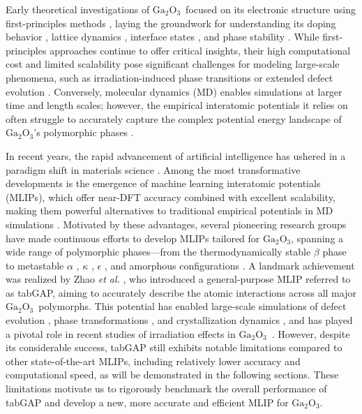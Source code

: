 \documentclass[%
reprint,
superscriptaddress,
 amsmath,amssymb,
 aps,
]{revtex4-2}
\newcommand{\ga}{$\text{Ga}_2\text{O}_3$}
\begin{document}
Early theoretical investigations of \ga\ focused on its electronic structure 
using first-principles methods \cite{he_first-principles_2006,xu_structure_2007,yoshioka_structures_2007}, 
laying the groundwork for understanding its doping behavior \cite{varley_oxygen_2010}, 
lattice dynamics \cite{yan_phonon_2018,yang_lattice_2024}, 
interface states \cite{bermudez_structure_2006}, and phase stability \cite{fan_low-energy_2022}. 
While first-principles approaches continue to offer critical insights, their high computational 
cost and limited scalability pose significant challenges for modeling large-scale phenomena, 
such as irradiation-induced phase transitions or extended defect evolution 
\cite{azarov_disorder-induced_2021,han_unraveling_2025}. 
Conversely, molecular dynamics (MD) enables simulations at larger time 
and length scales; however, the empirical interatomic potentials 
it relies on often struggle to accurately capture the complex potential energy landscape of 
\ga's polymorphic phases \cite{blanco_energetics_2005}. 

In recent years, the rapid advancement of artificial intelligence has ushered in a 
paradigm shift in materials science \cite{pyzer-knapp_accelerating_2022}. 
Among the most transformative developments is the emergence of machine learning interatomic 
potentials (MLIPs), which offer near-DFT accuracy combined with excellent scalability, 
making them powerful alternatives to traditional empirical potentials 
in MD simulations \cite{ko_recent_2023}. 
Motivated by these advantages, several pioneering research groups have made 
continuous efforts to develop MLIPs tailored for \ga, spanning a wide range of polymorphic 
phases---from the thermodynamically stable $\beta$ phase \cite{li_deep_2020,liu_machine_2020,zhao_phase_2021} 
to metastable $\alpha$ \cite{sun_neuroevolution_2023}, $\kappa$ \cite{wang_dissimilar_2024}, 
$\epsilon$ \cite{sun_neuroevolution_2023}, and amorphous configurations \cite{liu_unraveling_2023}. 
A landmark achievement was realized by Zhao \textit{et al.} \cite{zhao_complex_2023}, 
who introduced a general-purpose MLIP referred to as tabGAP, aiming to accurately 
describe the atomic interactions across all major \ga\ polymorphs. 
This potential has enabled large-scale simulations of 
defect evolution \cite{he_threshold_2024,he_ultrahigh_2024,liu_orientation-dependent_2025}, 
phase transformations \cite{azarov_self-assembling_2025}, 
and crystallization dynamics \cite{zhang_orientation-dependent_2023,li_edge-dependent_2025}, 
and has played a pivotal role in recent studies of irradiation effects in 
\ga\ \cite{azarov_universal_2023,zhao_crystallization_2025,han_electronic_2025,abdullaev_ions_2025}.
However, despite its considerable success, tabGAP still exhibits notable limitations compared 
to other state-of-the-art MLIPs, including relatively lower accuracy and computational 
speed, as will be demonstrated in the following sections. 
These limitations motivate us to rigorously benchmark the overall 
performance of tabGAP and develop a new, more accurate and efficient MLIP for \ga.
\end{document}

